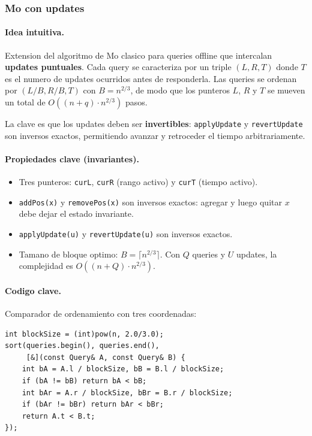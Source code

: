 \subsubsection{Mo con updates}

\paragraph{Idea intuitiva.}
Extension del algoritmo de Mo clasico para queries offline que intercalan \textbf{updates puntuales}. Cada query se caracteriza por un triple $(L, R, T)$ donde $T$ es el numero de updates ocurridos antes de responderla. Las queries se ordenan por $(L / B, R / B, T)$ con $B = n^{2/3}$, de modo que los punteros $L$, $R$ y $T$ se mueven un total de $O((n + q) \cdot n^{2/3})$ pasos.

La clave es que los updates deben ser \textbf{invertibles}: \verb|applyUpdate| y \verb|revertUpdate| son inversos exactos, permitiendo avanzar y retroceder el tiempo arbitrariamente.

\paragraph{Propiedades clave (invariantes).}
\begin{itemize}\setlength\itemsep{0pt}
	\item Tres punteros: \verb|curL|, \verb|curR| (rango activo) y \verb|curT| (tiempo activo).
	\item \verb|addPos(x)| y \verb|removePos(x)| son inversos exactos: agregar y luego quitar $x$ debe dejar el estado invariante.
	\item \verb|applyUpdate(u)| y \verb|revertUpdate(u)| son inversos exactos.
	\item Tamano de bloque optimo: $B = \lceil n^{2/3} \rceil$. Con $Q$ queries y $U$ updates, la complejidad es $O((n + Q) \cdot n^{2/3})$.
\end{itemize}

\paragraph{Codigo clave.}
Comparador de ordenamiento con tres coordenadas:
\begin{verbatim}
int blockSize = (int)pow(n, 2.0/3.0);
sort(queries.begin(), queries.end(),
     [&](const Query& A, const Query& B) {
    int bA = A.l / blockSize, bB = B.l / blockSize;
    if (bA != bB) return bA < bB;
    int bAr = A.r / blockSize, bBr = B.r / blockSize;
    if (bAr != bBr) return bAr < bBr;
    return A.t < B.t;
});
\end{verbatim}

